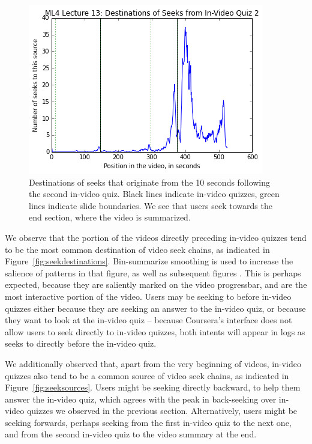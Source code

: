 \documentclass{sigchi}
\begin{document}
\begin{figure}
\includegraphics[width=1.0\columnwidth]{seekdest2}
\caption{Destinations of seeks that originate from the 10 seconds following the second in-video quiz. Black lines indicate in-video quizzes, green lines indicate slide boundaries. We see that users seek towards the end section, where the video is summarized.}
\label{fig:seekdest2}
\end{figure}

We observe that the portion of the videos directly preceding in-video quizzes tend to be the most common destination of video seek chains, as indicated in Figure~\ref{fig:seekdestinations}. Bin-summarize smoothing is used to increase the salience of patterns in that figure, as well as subsequent figures \cite{smoothing}. This is perhaps expected, because they are saliently marked on the video progressbar, and are the most interactive portion of the video. Users may be seeking to before in-video quizzes either because they are seeking an answer to the in-video quiz, or because they want to look at the in-video quiz -- because Coursera's interface does not allow users to seek directly to in-video quizzes, both intents will appear in logs as seeks to directly before the in-video quiz.

We additionally observed that, apart from the very beginning of videos, in-video quizzes also tend to be a common source of video seek chains, as indicated in Figure~\ref{fig:seeksources}. Users might be seeking directly backward, to help them answer the in-video quiz, which agrees with the peak in back-seeking over in-video quizzes we observed in the previous section. Alternatively, users might be seeking forwards, perhaps seeking from the first in-video quiz to the next one, and from the second in-video quiz to the video summary at the end.
\end{document}
